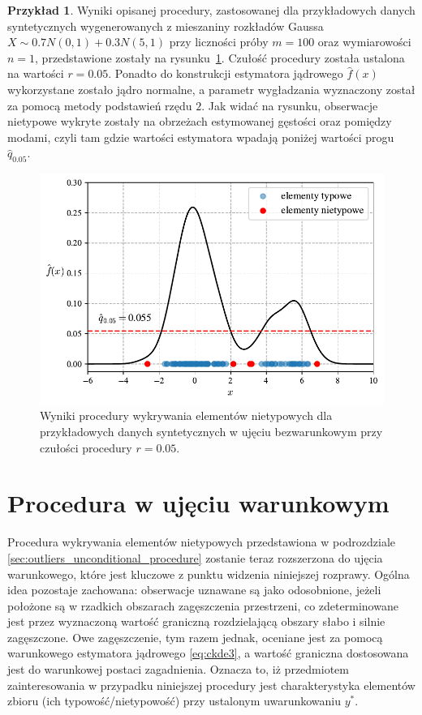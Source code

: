 \documentclass[12pt,a4paper,oneside]{book}
\theoremstyle{definition}
\newtheorem{exmp}{Przykład}[chapter]
\begin{document}
\begin{exmp}
Wyniki opisanej procedury, zastosowanej dla przykładowych danych syntetycznych wygenerowanych z mieszaniny rozkładów Gaussa $X \sim 0.7 N(0,1) + 0.3 N(5,1)$ przy liczności próby $m=100$ oraz wymiarowości $n=1$, przedstawione zostały na rysunku~\ref{fig:outliers_detection_example}. Czułość procedury została ustalona na wartości $r=0.05$. Ponadto do konstrukcji estymatora jądrowego $\hat{f}(x)$ wykorzystane zostało jądro normalne, a parametr wygładzania wyznaczony został za pomocą metody podstawień rzędu $2$. Jak widać na rysunku, obserwacje nietypowe wykryte zostały na obrzeżach estymowanej gęstości oraz pomiędzy modami, czyli tam gdzie wartości estymatora wpadają poniżej wartości progu $\hat{q}_{0.05}$.
\begin{figure}[H]
    \centering
    \includegraphics[scale=0.7]{outliers_detection_example}
    \vspace{-0.5cm} 
    \caption{Wyniki procedury wykrywania elementów nietypowych dla przykładowych danych syntetycznych w ujęciu bezwarunkowym przy czułości procedury $r=0.05$.}
    \label{fig:outliers_detection_example}
\end{figure}
\end{exmp}

\section{Procedura w ujęciu warunkowym}

Procedura wykrywania elementów nietypowych przedstawiona w podrozdziale \ref{sec:outliers_unconditional_procedure} zostanie teraz rozszerzona do ujęcia warunkowego, które jest kluczowe z punktu widzenia niniejszej rozprawy. Ogólna idea pozostaje zachowana: obserwacje uznawane są jako odosobnione, jeżeli położone są w rzadkich obszarach zagęszczenia przestrzeni, co zdeterminowane jest przez wyznaczoną wartość graniczną rozdzielającą obszary słabo i silnie zagęszczone. Owe zagęszczenie, tym razem jednak, oceniane jest za pomocą warunkowego estymatora jądrowego \eqref{eq:ckde3}, a wartość graniczna dostosowana jest do warunkowej postaci zagadnienia. Oznacza to, iż przedmiotem zainteresowania w przypadku niniejszej procedury jest charakterystyka elementów zbioru (ich typowość/nietypowość) przy ustalonym uwarunkowaniu $y^*$.
\end{document}
